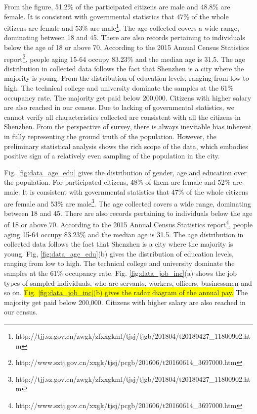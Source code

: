 \documentclass{ieeeaccess}
\begin{document}
From the figure, 51.2\% of the participated citizens are male and 48.8\% are female. It is consistent with governmental statistics that 47\% of the whole citizens are female and 53\% are male\footnote{http://tjj.sz.gov.cn/zwgk/zfxxgkml/tjsj/tjgb/201804/t20180427\_11800902.htm}. The age collected covers a wide range, dominating between 18 and 45. There are also records pertaining to individuals below the age of 18 or above 70. According to the 2015 Annual Census Statistics report\footnote{http://www.sztj.gov.cn/xxgk/tjsj/pcgb/201606/t20160614\_3697000.htm}, people aging 15-64 occupy 83.23\% and the median age is 31.5. The age distribution in collected data follows the fact that Shenzhen is a city where the majority is young. From the distribution of education levels, ranging from low to high. The technical college and university dominate the samples at the 61\% occupancy rate. The majority get paid below 200,000. Citizens with higher salary are also reached in our census. Due to lacking of governmental statistics, we cannot verify all characteristics collected are consistent with all the citizens in Shenzhen. From the perspective of survey, there is always inevitable bias inherent in fully representing the ground truth of the population. However, the preliminary statistical analysis shows the rich scope of the data, which embodies positive sign of a relatively even sampling of the population in the city.


\iffalse
Fig. \ref{fig:data_age_edu} gives the distribution of gender, age and education over the population. For participated citizens, 48\% of them are female and 52\% are male. It is consistent with governmental statistics that 47\% of the whole citizens are female and 53\% are male\footnote{http://tjj.sz.gov.cn/zwgk/zfxxgkml/tjsj/tjgb/201804/t20180427\_11800902.htm}. The age collected covers a wide range, dominating between 18 and 45. There are also records pertaining to individuals below the age of 18 or above 70. According to the 2015 Annual Census Statistics report\footnote{http://www.sztj.gov.cn/xxgk/tjsj/pcgb/201606/t20160614\_3697000.htm}, people aging 15-64 occupy 83.23\% and the median age is 31.5. The age distribution in collected data follows the fact that Shenzhen is a city where the majority is young. Fig, \ref{fig:data_age_edu}(b) gives the distribution of education levels, ranging from low to high. The technical college and university dominate the samples at the 61\% occupancy rate. Fig. \ref{fig:data_job_inc}(a) shows the job types of sampled individuals, who are servants, workers, officers, businessmen and so on. \colorbox{yellow}{Fig. \ref{fig:data_job_inc}(b) gives the radar diagram of the annual pay.} The majority get paid below 200,000. Citizens with higher salary are also reached in our census.
\end{document}

